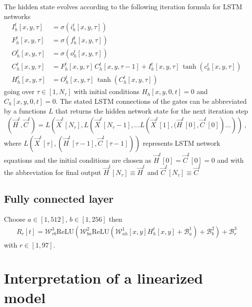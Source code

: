 \documentclass[10pt,a4paper]{article}
\begin{document}
The hidden state evolves according to the following iteration formula for LSTM networks
%
\begin{align}
I^t_h[x,y,\tau] & = \sigma (i^t_h[x,y,\tau]) \\
F^t_h[x,y,\tau] & = \sigma (f^t_h[x,y,\tau]) \\
O^t_h[x,y,\tau] & = \sigma (o^t_h[x,y,\tau]) \\
C^t_h[x,y,\tau] & = F^t_h[x,y,\tau] \, C^t_h[x,y,\tau-1] + I^t_h[x,y,\tau] \, \tanh (c^t_h[x,y,\tau]) \\
H^t_h[x,y,\tau] & = O^t_h[x,y,\tau]\, \tanh(C^t_h[x,y,\tau])
\end{align}
%
going over $\tau \in [1,N_\tau]$ with initial conditions $H_h[x,y,0,t]=0$ and $C_h[x,y,0,t]=0$.
%
The stated LSTM connections of the gates can be abbreviated by a functions $L$ that returns the hidden network state for the next iteration step
%
\begin{align}
\left(\vec{H}^t, \vec{C}^t \right) = L \left( \vec{X}^t[N_\tau], L \left( \vec{X}^t[N_\tau-1], \ldots L \left( \vec{X}^t[1], (\vec{H}^t[0], \vec{C}^t[0] \right) \ldots \right) \right) \ ,
\end{align}
where $L\left(\vec{X}^t[\tau], \left(\vec{H}^t[\tau-1], \vec{C}^t[\tau-1] \right) \right)$ represents LSTM network equations and the initial conditions are chosen as $\vec{H}^t[0]=\vec{C}^t[0]=0$ and with the abbreviation for final output $\vec{H}^t[N_\tau] \equiv \vec{H}^t$ and $\vec{C}^t[N_\tau] \equiv \vec{C}^t$

\subsection{Fully connected layer}

Choose $a \in [1, 512]$, $b \in [1, 256]$ then
%
\begin{align}
R_r[t] = \mathcal{W}^{3}_{rb}\mathrm{ReLU}\left(\mathcal{W}^{2}_{ba}\mathrm{ReLU}\left(\mathcal{W}^{1}_{ah} [x,y] H^t_h[x,y] + \mathcal{B}^1_a\right) + \mathcal{B}^2_b \right) + \mathcal{B}^3_r
\end{align}
%
with $r \in [1, 97]$.


\section{Interpretation of a linearized model}
\end{document}
